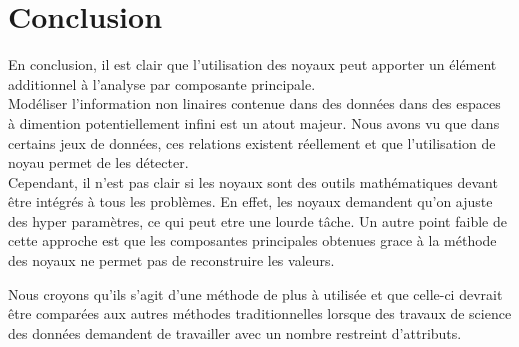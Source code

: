 \section{Conclusion}

En conclusion, il est clair que l'utilisation des noyaux peut apporter un élément additionnel à l'analyse par composante principale.\\

Modéliser l'information non linaires contenue dans des données dans des espaces à dimention potentiellement infini est un atout majeur.
Nous avons vu que dans certains jeux de données, ces relations existent réellement et que l'utilisation de noyau permet de les détecter.\\

Cependant, il n'est pas clair si les noyaux sont des outils mathématiques devant être intégrés à tous les problèmes. 
En effet, les noyaux demandent qu'on ajuste des hyper paramètres, ce qui peut etre une lourde tâche. Un autre point faible de 
cette approche est que les composantes principales obtenues grace à la méthode des noyaux ne permet pas de reconstruire les 
valeurs. 

Nous croyons qu'ils s'agit d'une méthode de plus à utilisée et que celle-ci devrait être comparées aux autres méthodes
traditionnelles lorsque des travaux de science des données demandent de travailler avec un nombre restreint d'attributs.